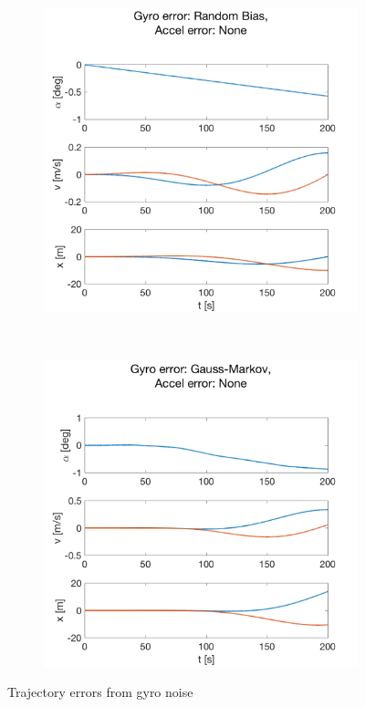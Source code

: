 \documentclass{article}
\begin{document}
\begin{figure}[H]
    \centering
    \begin{subfigure}[t]{0.49\textwidth}
        \centering
        \includegraphics[width=\textwidth]{fig/gyro_bc}
        \caption{}
    \end{subfigure}
    ~
    \begin{subfigure}[t]{0.49\textwidth}
        \centering
        \includegraphics[width=\textwidth]{fig/gyro_gm}
        \caption{}
    \end{subfigure}
    \caption{Trajectory errors from gyro noise}
    \label{fig:error_gyro_1}
\end{figure}
\end{document}
